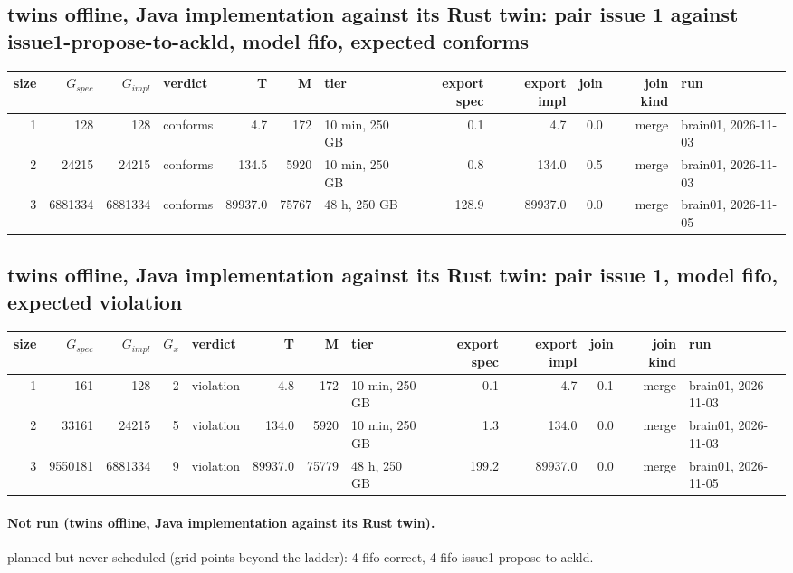 \documentclass[10pt]{article}
\begin{document}
\subsection*{twins offline, Java implementation against its Rust twin: pair \textsf{issue 1} against \textsf{issue1-propose-to-ackld}, model fifo, expected conforms}
\begin{longtable}{@{}rrrlrrlrrrrl@{}}
\toprule
size & $G_{\mathit{spec}}$ & $G_{\mathit{impl}}$ & verdict & T & M & tier & export spec & export impl & join & join kind & run \\
\midrule
\endhead
\color{blue} 1 & 128 & 128 & conforms & 4.7 & 172 & 10 min, 250 GB & 0.1 & 4.7 & 0.0 & merge & brain01, 2026-11-03 \\
\color{blue} 2 & 24215 & 24215 & conforms & 134.5 & 5920 & 10 min, 250 GB & 0.8 & 134.0 & 0.5 & merge & brain01, 2026-11-03 \\
\color{blue} 3 & 6881334 & 6881334 & conforms & 89937.0 & 75767 & 48 h, 250 GB & 128.9 & 89937.0 & 0.0 & merge & brain01, 2026-11-05 \\
\bottomrule
\end{longtable}
\subsection*{twins offline, Java implementation against its Rust twin: pair \textsf{issue 1}, model fifo, expected violation}
\begin{longtable}{@{}rrrrlrrlrrrrl@{}}
\toprule
size & $G_{\mathit{spec}}$ & $G_{\mathit{impl}}$ & $G_x$ & verdict & T & M & tier & export spec & export impl & join & join kind & run \\
\midrule
\endhead
\color{blue} 1 & 161 & 128 & 2 & violation & 4.8 & 172 & 10 min, 250 GB & 0.1 & 4.7 & 0.1 & merge & brain01, 2026-11-03 \\
\color{blue} 2 & 33161 & 24215 & 5 & violation & 134.0 & 5920 & 10 min, 250 GB & 1.3 & 134.0 & 0.0 & merge & brain01, 2026-11-03 \\
\color{blue} 3 & 9550181 & 6881334 & 9 & violation & 89937.0 & 75779 & 48 h, 250 GB & 199.2 & 89937.0 & 0.0 & merge & brain01, 2026-11-05 \\
\bottomrule
\end{longtable}
\paragraph{Not run (twins offline, Java implementation against its Rust twin).}
planned but never scheduled (grid points beyond the ladder): 4 fifo correct, 4 fifo issue1-propose-to-ackld.\par
\end{document}
